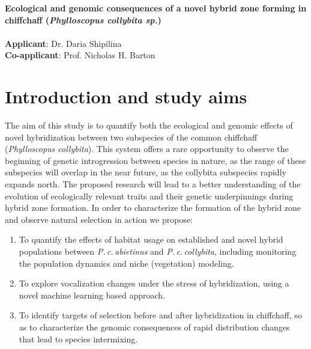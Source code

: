 \documentclass[11pt,a4paper]{article}
\begin{document}
\setcounter{page}{1}

\thispagestyle{empty}



\begin{center}
\large{\textbf{
Ecological and genomic consequences of a novel hybrid zone forming in chiffchaff (\emph{Phylloscopus collybita sp.})}}\\
\ \\

{ \textbf{Applicant}: Dr. Daria Shipilina     \\ \textbf{Co-applicant}: Prof. Nicholas H. Barton}
\end{center}



\tableofcontents

\clearpage


\section{Introduction and study aims}
The aim of this study is to quantify both the ecological and genomic effects of novel hybridization between two subspecies of the common chiffchaff (\textit{Phylloscopus collybita}). This system offers a rare opportunity to observe the beginning of genetic introgression between species in nature, as the range of these subspecies will overlap in the near future, as the collybita subspecies rapidly expands north. The proposed research will lead to a better understanding of the evolution of ecologically relevant traits and their genetic underpinnings during hybrid zone formation. In order to characterize the formation of the hybrid zone and observe natural selection in action we propose:
\begin{enumerate}
    \item To quantify the effects of habitat usage on established and novel hybrid populations between \textit{P.\,c.\,abietinus} and \textit{P.\,c.\,collybita}, including monitoring the population dynamics and niche (vegetation) modeling. 
\item To explore vocalization changes under the stress of hybridization, using a novel machine learning based approach. %
\item To identify targets of selection before and after hybridization in chiffchaff, so as to characterize the genomic consequences of rapid distribution changes that lead to species intermixing.
\end{enumerate}
\end{document}

